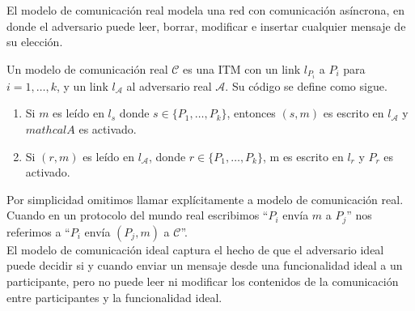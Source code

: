 El modelo de comunicación real modela una red con comunicación asíncrona, en donde el adversario
puede leer, borrar, modificar e insertar cualquier mensaje de su elección.

\begin{definicion}
Un modelo de comunicación real $\mathcal{C}$ es una ITM con un link $l_{P_i}$ a $P_i$
para $i = 1, \ldots, k$, y un link $l_\mathcal{A}$ al adversario real $\mathcal{A}$.
Su código se define como sigue.
\begin{enumerate}
  \item Si $m$ es leído en $l_s$ donde $s \in \{P_1, \ldots, P_k\}$, entonces $(s, m)$ es
        escrito en $l_\mathcal{A}$ y $mathcal{A}$ es activado.
  \item Si $(r, m)$ es leído en $l_\mathcal{A}$, donde $r \in \{P_1, \ldots, P_k\}$,
        m es escrito en $l_r$ y $P_r$ es activado.
\end{enumerate}
\end{definicion}

Por simplicidad omitimos llamar explícitamente a modelo de comunicación real.
Cuando en un protocolo del mundo real escribimos ``$P_i$ envía $m$ a $P_j$''
nos referimos a ``$P_i$ envía $(P_j, m)$ a $\mathcal{C}$''.\\
El modelo de comunicación ideal captura el hecho de que el adversario ideal puede
decidir si y cuando enviar un mensaje desde una funcionalidad ideal a un participante,
pero no puede leer ni modificar los contenidos de la comunicación entre participantes
y la funcionalidad ideal.

